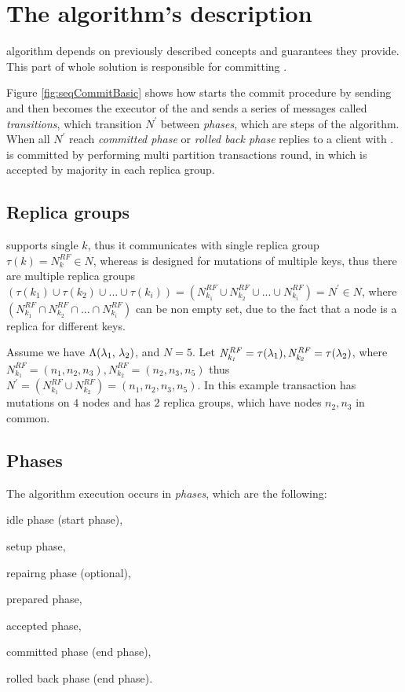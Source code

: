 
\section{The algorithm's description}
\mpt algorithm depends on previously described \paxos concepts and guarantees they provide. 
This part of whole solution is responsible for committing \transaction. 

Figure \ref{fig:seqCommitBasic} shows how \client starts the commit procedure by sending \txCommitMessage and then  becomes the executor of the \transaction and sends a series of messages called \emph{transitions}, which transition $\mathit{N}^'$ between \emph{phases}, which are steps of the algorithm. When all $\mathit{N}^'$ reach \emph{committed phase} or \emph{rolled back phase}  replies to a client with \txCommitResonseMessage.  \transaction is committed by performing multi partition transactions \paxos round, 
in which \txState is accepted by majority in each replica group.



\subsection{Replica groups}
\label{sec:mpp:replicaGroups}
\lwt supports single $k$, thus it communicates with single replica group $\tau(k) = N^{RF}_{k} \in \mathit{N}$, whereas \mpt is designed for mutations of multiple keys, thus there are multiple replica groups 
$(\tau(k_1) \cup \tau(k_2) \cup ... \cup \tau(k_i) ) = (N^{RF}_{k_1} \cup N^{RF}_{k_2} \cup ... \cup N^{RF}_{k_i} ) = \mathit{N^'} \in \mathit{N}$, where $(N^{RF}_{k_1} \cap N^{RF}_{k_2} \cap ... \cap N^{RF}_{k_i})$ can be non empty set, due to the fact that a node is a replica for different keys.

Assume we have $\text{$\Lambda$}(\text{$\lambda_{1}$, $\lambda_{2}$})$,  and $N=5$. Let $\mathit{N^{RF}_{k_1}} = \tau(\text{$\lambda_{1}$}), \mathit{N^{RF}_{k_2}} = \tau(\text{$\lambda_{2}$})$, where $\mathit{N^{RF}_{k_1}} = (n_1,n_2,n_3), \mathit{N^{RF}_{k_2}} = (n_2,n_3,n_5)$ thus $\mathit{N}^' = (N^{RF}_{k_1} \cup N^{RF}_{k_2}) = (n_1, n_2, n_3, n_5)$.
In this example transaction has mutations on $4$ nodes and has
$2$ replica groups, which have nodes $n_2, n_3$ in common.  


\subsection{Phases}
The algorithm execution occurs in \emph{phases}, which are the following: 
\begin{enumerate*}
\item idle phase (start phase),
\item setup phase,
\item repairng phase (optional),
\item prepared phase,
\item accepted phase,
\item committed phase (end phase),
\item rolled back phase (end phase).
\end{enumerate*}

